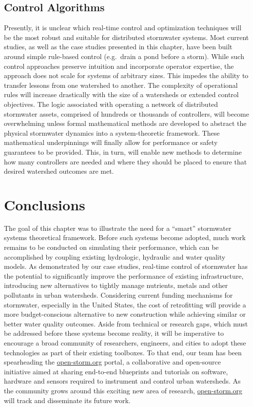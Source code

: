 \subsection{Control Algorithms}
Presently, it is unclear which real-time control and optimization techniques will be the most robust and suitable for distributed stormwater systems.  Most current studies, as well as the case studies presented in this chapter, have been built around simple rule-based control (e.g.\ drain a pond before a storm). While such control approaches preserve intuition and incorporate operator expertise, the approach does not scale for systems of arbitrary sizes. This impedes the ability to transfer lessons from one watershed to another. The complexity of operational rules will increase drastically with the size of a watersheds or extended control objectives. The logic associated with operating a network of distributed stormwater assets, comprised of hundreds or thousands of controllers, will become overwhelming unless formal mathematical methods are developed to abstract the physical stormwater dynamics into a system-theoretic framework. These mathematical underpinnings will finally allow for performance or safety guarantees to be provided. This, in turn, will enable new methods to determine how many controllers are needed and where they should be placed to ensure that desired watershed outcomes are met. 

\section{Conclusions}
The goal of this chapter was to illustrate the need for a ``smart'' stormwater systems theoretical framework. Before such systems become adopted, much work remains to be conducted on simulating their performance, which can be accomplished by coupling existing hydrologic, hydraulic and water quality models. As demonstrated by our case studies, real-time control of stormwater has the potential to significantly improve the performance of existing infrastructure, introducing new alternatives to tightly manage nutrients, metals and other pollutants in urban watersheds. Considering current funding mechanisms for stormwater, especially in the United States, the cost of retrofitting will provide a more budget-conscious alternative to new construction while achieving similar or better water quality outcomes. Aside from technical or research gaps, which must be addressed before these systems become reality, it will be imperative to encourage a broad community of researchers, engineers, and cities to adopt these technologies as part of their existing toolboxes. To that end, our team has been spearheading the \href{http://open-storm.org}{open-storm.org} portal, a collaborative and open-source initiative aimed at sharing end-to-end blueprints and tutorials on software, hardware and sensors required to instrument and control urban watersheds. As the community grows around this exciting new area of research, \href{http://open-storm.org}{open-storm.org} will track and disseminate its future work.
